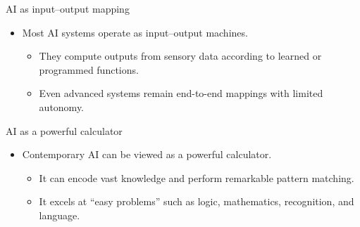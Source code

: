 \documentclass[12pt]{beamer}
\begin{document}


\begin{frame}{AI as input--output mapping}
  \begin{itemize}
    \item Most AI systems operate as input--output machines.
      \begin{itemize}
        \item They compute outputs from sensory data according to learned or programmed functions.
        \item Even advanced systems remain end-to-end mappings with limited autonomy.
      \end{itemize}
  \end{itemize}
\end{frame}

\begin{frame}{AI as a powerful calculator}
  \begin{itemize}
    \item Contemporary AI can be viewed as a powerful calculator.
      \begin{itemize}
        \item It can encode vast knowledge and perform remarkable pattern matching.
        \item It excels at ``easy problems'' such as logic, mathematics, recognition, and language.
      \end{itemize}
  \end{itemize}
\end{frame}
\end{document}
